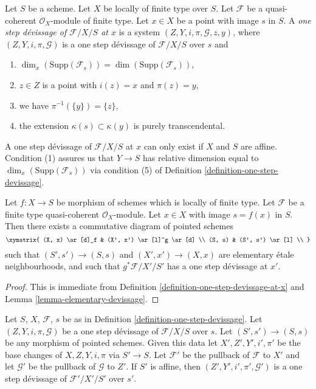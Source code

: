 \begin{definition}
\label{definition-one-step-devissage-at-x}
Let $S$ be a scheme.
Let $X$ be locally of finite type over $S$.
Let $\mathcal{F}$ be a quasi-coherent $\mathcal{O}_X$-module of finite type.
Let $x \in X$ be a point with image $s$ in $S$.
A {\it one step d\'evissage of $\mathcal{F}/X/S$ at $x$}
is a system $(Z, Y, i, \pi, \mathcal{G}, z, y)$, where
$(Z, Y, i, \pi, \mathcal{G})$ is a one step d\'evissage of
$\mathcal{F}/X/S$ over $s$ and
\begin{enumerate}
\item $\dim_x(\text{Supp}(\mathcal{F}_s)) = \dim(\text{Supp}(\mathcal{F}_s))$,
\item $z \in Z$ is a point with $i(z) = x$ and $\pi(z) = y$,
\item we have $\pi^{-1}(\{y\}) = \{z\}$,
\item the extension $\kappa(s) \subset \kappa(y)$ is purely
transcendental.
\end{enumerate}
\end{definition}

\noindent
A one step d\'evissage of $\mathcal{F}/X/S$ at $x$ can only exist if
$X$ and $S$ are affine. Condition (1) assures us that $Y \to S$ has
relative dimension equal to $\dim_x(\text{Supp}(\mathcal{F}_s))$
via condition (5) of
Definition \ref{definition-one-step-devissage}.

\begin{lemma}
\label{lemma-elementary-devissage-variant}
Let $f : X \to S$ be morphism of schemes which is locally of finite type.
Let $\mathcal{F}$ be a finite type quasi-coherent $\mathcal{O}_X$-module.
Let $x \in X$ with image $s = f(x)$ in $S$.
Then there exists a commutative diagram of pointed schemes
$$
\xymatrix{
(X, x) \ar[d]_f & (X', x') \ar[l]^g \ar[d] \\
(S, s) & (S', s') \ar[l] \\
}
$$
such that $(S', s') \to (S, s)$ and $(X', x') \to (X, x)$
are elementary \'etale neighbourhoods, and such that
$g^*\mathcal{F}/X'/S'$ has a one step d\'evissage at $x'$.
\end{lemma}

\begin{proof}
This is immediate from
Definition \ref{definition-one-step-devissage-at-x}
and
Lemma \ref{lemma-elementary-devissage}.
\end{proof}

\begin{lemma}
\label{lemma-base-change-one-step}
Let $S$, $X$, $\mathcal{F}$, $s$ be as in
Definition \ref{definition-one-step-devissage}.
Let $(Z, Y, i, \pi, \mathcal{G})$ be a one step d\'evissage
of $\mathcal{F}/X/S$ over $s$.
Let $(S', s') \to (S, s)$ be any morphism of pointed schemes.
Given this data let $X', Z', Y', i', \pi'$ be the base
changes of $X, Z, Y, i, \pi$ via $S' \to S$.
Let $\mathcal{F}'$ be the pullback of $\mathcal{F}$ to $X'$
and let $\mathcal{G}'$ be the pullback of $\mathcal{G}$ to $Z'$.
If $S'$ is affine, then $(Z', Y', i', \pi', \mathcal{G}')$
is a one step d\'evissage of $\mathcal{F}'/X'/S'$ over $s'$.
\end{lemma}

